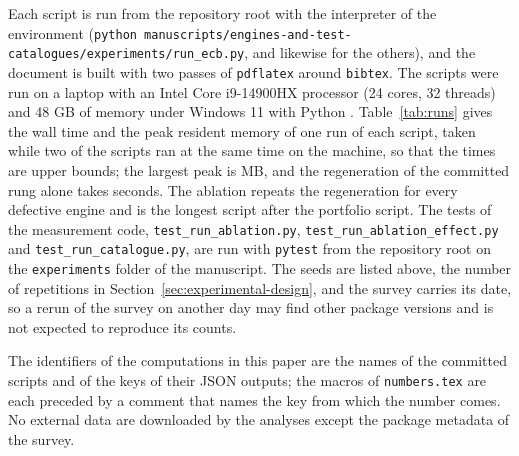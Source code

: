 Each script is run from the repository root with the interpreter of the environment (\texttt{python manuscripts/engines-and-test-catalogues/experiments/run\_ecb.py}, and likewise for the others), and the document is built with two passes of \texttt{pdflatex} around \texttt{bibtex}. The scripts were run on a laptop with an Intel Core i9-14900HX processor (24 cores, 32 threads) and 48 GB of memory under Windows 11 with Python \runPython{}. Table~\ref{tab:runs} gives the wall time and the peak resident memory of one run of each script, taken while two of the scripts ran at the same time on the machine, so that the times are upper bounds; the largest peak is \runPeakMax{} MB, and the regeneration of the committed rung alone takes \regenSeconds{} seconds. The ablation repeats the regeneration for every defective engine and is the longest script after the portfolio script. The tests of the measurement code, \texttt{test\_run\_ablation.py}, \texttt{test\_run\_ablation\_effect.py} and \texttt{test\_run\_catalogue.py}, are run with \texttt{pytest} from the repository root on the \texttt{experiments} folder of the manuscript. \ablRerunSentence{} The seeds are listed above, the number of repetitions in Section~\ref{sec:experimental-design}, and the survey carries its date, so a rerun of the survey on another day may find other package versions and is not expected to reproduce its counts.

The identifiers of the computations in this paper are the names of the committed scripts and of the keys of their JSON outputs; the macros of \texttt{numbers.tex} are each preceded by a comment that names the key from which the number comes. No external data are downloaded by the analyses except the package metadata of the survey.
